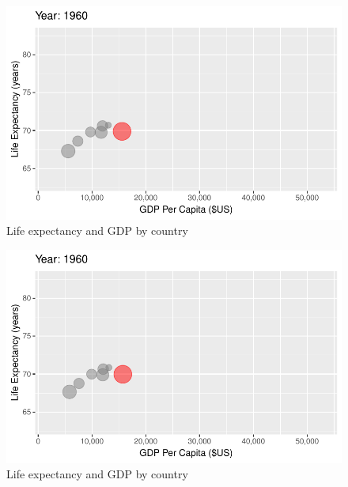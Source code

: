 \documentclass[
  letterpaper,
  DIV=11,
  numbers=noendperiod]{scrreport}
\theoremstyle{definition}
\theoremstyle{remark}
\begin{document}
\begin{figure}

{\centering \includegraphics{index_files/figure-pdf/fig-anim-country-15.pdf}

}

\caption{\label{fig-anim-country-15}Life expectancy and GDP by country}

\end{figure}

\begin{figure}

{\centering \includegraphics{index_files/figure-pdf/fig-anim-country-16.pdf}

}

\caption{\label{fig-anim-country-16}Life expectancy and GDP by country}

\end{figure}
\end{document}
